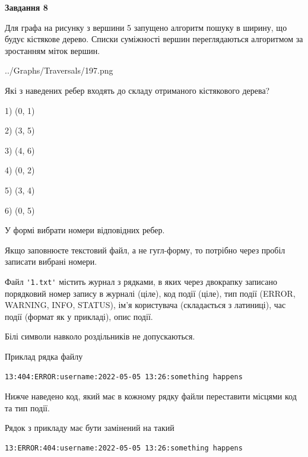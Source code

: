 \documentclass[12pt, ukrainian]{article}
\def\code#1{\Verb!#1!}
\begin{document}
{\begin {large}
{\begin {center}\textbf{Завдання 8}\end {center}}\par
Для графа на рисунку з вершини 5 запущено алгоритм пошуку в ширину, що будує кістякове дерево. Списки суміжності вершин переглядаються алгоритмом за зростанням міток вершин.\par
\begin{center}
	{../Graphs/Traversals/197.png}
\end{center}
\par Які з наведених ребер входять до складу отриманого кістякового дерева?\par
1) (0, 1)\par
2) (3, 5)\par
3) (4, 6)\par
4) (0, 2)\par
5) (3, 4)\par
6) (0, 5)\par
{\vskip 15pt} У формі вибрати номери відповідних ребер.


Якщо заповнюєте текстовий файл, а не гугл-форму, то потрібно через пробіл записа\-ти вибрані номери.\par
\newpage


Файл \code{'1.txt'} містить журнал з рядками, в яких через двокрапку записано поряд\-ко\-вий номер запису в журналі (ціле), код події (ціле), тип події (ERROR,\\ WARNING, INFO, STATUS), ім'я користувача (складається з латиниці), час події (фор\-мат як у прикладі), опис події.

Білі символи навколо роздільників не допускаються.

Приклад рядка файлу



\begin{verbatim}
13:404:ERROR:username:2022-05-05 13:26:something happens
\end{verbatim}


Нижче наведено код, який має в кожному рядку файли переставити місцями код та тип події.

Рядок з прикладу має бути замінений на такий



\begin{verbatim}
13:ERROR:404:username:2022-05-05 13:26:something happens
\end{verbatim}





\end{large}}
\end{document}
